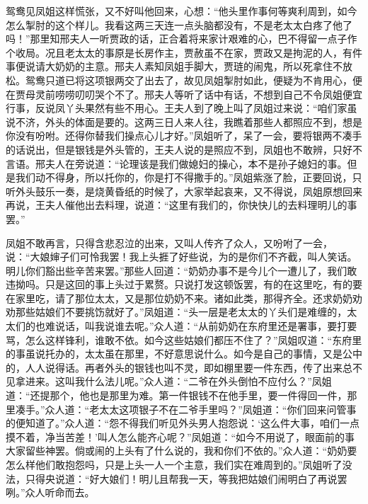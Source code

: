 \begin{parag}
    鸳鸯见凤姐这样慌张，又不好叫他回来，心想：“他头里作事何等爽利周到，如今怎么掣肘的这个样儿。我看这两三天连一点头脑都没有，不是老太太白疼了他了吗！”那里知邢夫人一听贾政的话，正合着将来家计艰难的心，巴不得留一点子作个收局。况且老太太的事原是长房作主，贾赦虽不在家，贾政又是拘泥的人，有件事便说请大奶奶的主意。邢夫人素知凤姐手脚大，贾琏的闹鬼，所以死拿住不放松。鸳鸯只道已将这项银两交了出去了，故见凤姐掣肘如此，便疑为不肯用心，便在贾母灵前唠唠叨叨哭个不了。邢夫人等听了话中有话，不想到自己不令凤姐便宜行事，反说凤丫头果然有些不用心。王夫人到了晚上叫了凤姐过来说：“咱们家虽说不济，外头的体面是要的。这两三日人来人往，我瞧着那些人都照应不到，想是你没有吩咐。还得你替我们操点心儿才好。”凤姐听了，呆了一会，要将银两不凑手的话说出，但是银钱是外头管的，王夫人说的是照应不到，凤姐也不敢辨，只好不言语。邢夫人在旁说道：“论理该是我们做媳妇的操心，本不是孙子媳妇的事。但是我们动不得身，所以托你的，你是打不得撒手的。”凤姐紫涨了脸，正要回说，只听外头鼓乐一奏，是烧黄昏纸的时候了，大家举起哀来，又不得说，凤姐原想回来再说，王夫人催他出去料理，说道：“这里有我们的，你快快儿的去料理明儿的事罢。”
\end{parag}


\begin{parag}
    凤姐不敢再言，只得含悲忍泣的出来，又叫人传齐了众人，又吩咐了一会，说：“大娘婶子们可怜我罢！我上头捱了好些说，为的是你们不齐截，叫人笑话。明儿你们豁出些辛苦来罢。”那些人回道：“奶奶办事不是今儿个一遭儿了，我们敢违拗吗。只是这回的事上头过于累赘。只说打发这顿饭罢，有的在这里吃，有的要在家里吃，请了那位太太，又是那位奶奶不来。诸如此类，那得齐全。还求奶奶劝劝那些姑娘们不要挑饬就好了。”凤姐道：“头一层是老太太的丫头们是难缠的，太太们的也难说话，叫我说谁去呢。”众人道：“从前奶奶在东府里还是署事，要打要骂，怎么这样锋利，谁敢不依。如今这些姑娘们都压不住了？”凤姐叹道：“东府里的事虽说托办的，太太虽在那里，不好意思说什么。如今是自己的事情，又是公中的，人人说得话。再者外头的银钱也叫不灵，即如棚里要一件东西，传了出来总不见拿进来。这叫我什么法儿呢。”众人道：“二爷在外头倒怕不应付么？”凤姐道：“还提那个，他也是那里为难。第一件银钱不在他手里，要一件得回一件，那里凑手。”众人道：“老太太这项银子不在二爷手里吗？”凤姐道：“你们回来问管事的便知道了。”众人道：“怨不得我们听见外头男人抱怨说：‘这么件大事，咱们一点摸不着，净当苦差！’叫人怎么能齐心呢？”凤姐道：“如今不用说了，眼面前的事大家留些神罢。倘或闹的上头有了什么说的，我和你们不依的。”众人道：“奶奶要怎么样他们敢抱怨吗，只是上头一人一个主意，我们实在难周到的。”凤姐听了没法，只得央说道：“好大娘们！明儿且帮我一天，等我把姑娘们闹明白了再说罢咧。”众人听命而去。
\end{parag}


